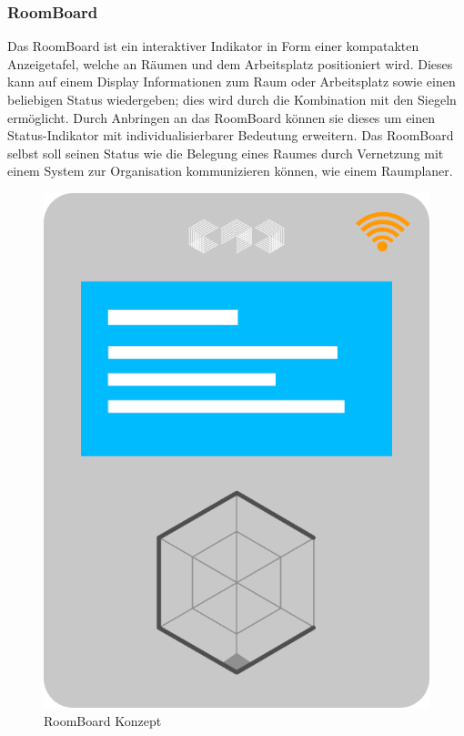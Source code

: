 \documentclass{article}
\begin{document}
\subsubsection*{RoomBoard} 
Das RoomBoard ist ein interaktiver Indikator in Form einer kompatakten Anzeigetafel, welche an Räumen und dem Arbeitsplatz positioniert wird. Dieses kann auf einem Display Informationen zum Raum oder Arbeitsplatz sowie einen beliebigen Status wiedergeben; dies wird durch die Kombination mit den Siegeln ermöglicht. Durch Anbringen an das RoomBoard können sie dieses um einen Status-Indikator mit individualisierbarer Bedeutung erweitern. Das RoomBoard selbst soll seinen Status wie die Belegung eines Raumes durch Vernetzung mit einem System zur Organisation kommunizieren können, wie einem Raumplaner.
\begin{figure}[h]
  \centering
  \includegraphics[width=.7\linewidth]{images/roomboard-concept.png}
  \caption{RoomBoard Konzept}
  \label{fig:sub1}
\end{figure}
\end{document}

